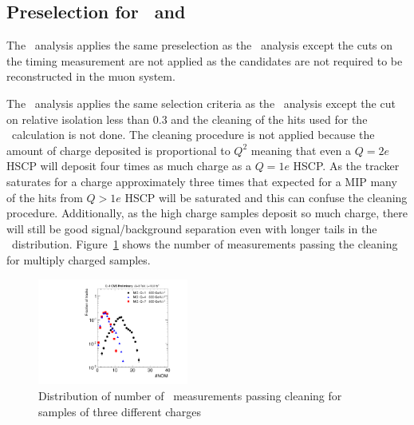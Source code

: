 \subsection{Preselection for \tkonly\ and \multi\ \label{sec:otherpreselection}}

The \tkonly\ analysis applies the same preselection as the \tktof\ analysis except the cuts on the timing measurement are not applied as the candidates
are not required to be reconstructed in the muon system. 

The \multi\ analysis applies
the same selection criteria as the \tktof\ analysis except the cut on relative isolation less than 0.3 and the cleaning of the hits used for the \dedx\ calculation
is not done. The cleaning procedure is not applied because the amount of charge deposited is proportional to $Q^2$ meaning that even a $Q=2e$ HSCP will
deposit four times as much charge as a $Q=1e$ HSCP. As the tracker saturates for a charge approximately three times that expected for a MIP many of the hits from $Q>1e$ HSCP
will be saturated and this can confuse the cleaning procedure. Additionally, as the high charge samples deposit so much charge, 
there will still be good signal/background separation even with longer tails in the \dedx\ distribution.
Figure~\ref{fig:Multi} shows the number of measurements passing the cleaning for multiply charged samples.

\begin{figure}
\centering
  \includegraphics[clip=true, trim=0.0cm 0cm 2.8cm 0cm, width=0.44\textwidth]{figures/multi/Selection_Comp_8TeV_DY_QG_NOM_BS}
  \caption{Distribution of number of \dedx\ measurements passing cleaning for samples of three different charges
    \label{fig:Multi}}
\end{figure}

